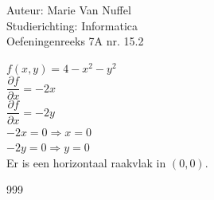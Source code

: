 \documentclass[a4paper]{article}
\begin{document}
  
\noindent \large Auteur: Marie Van Nuffel \\
\noindent \large Studierichting: Informatica\\
\noindent \large Oefeningenreeks 7A nr. 15.2\\

\medskip

\normalsize

$f(x,y) = 4-x^2-y^2$\\

$\dfrac{\partial f}{\partial x} = -2x$\\

$\dfrac{\partial f}{\partial x} = -2y$\\

$-2x = 0\Rightarrow x = 0$\\

$-2y = 0\Rightarrow y = 0$\\

Er is een horizontaal raakvlak in $(0,0)$.\\


\begin{thebibliography}{999}
\end{thebibliography}
\end{document}
